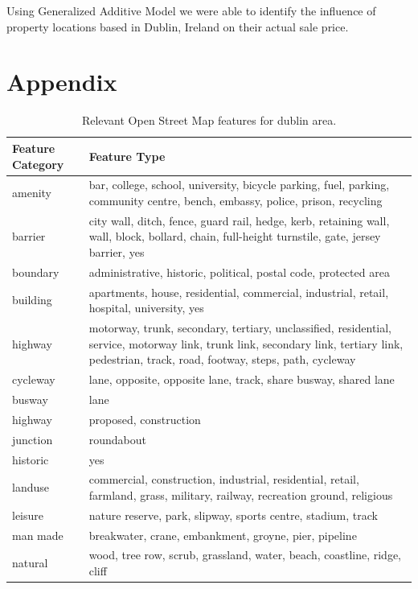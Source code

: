 \documentclass[]{elsarticle} %
\begin{document}
Using Generalized Additive Model we were able to identify the influence
of property locations based in Dublin, Ireland on their actual sale
price.

\section{Appendix}\label{appendix}

\begin{table}[t]

\caption{\label{tab:all_OSM_features}Relevant Open Street Map features for dublin area.}
\centering
\fontsize{8}{10}\selectfont
\begin{tabular}{l>{\raggedright\arraybackslash}p{3in}}
\toprule
Feature Category & Feature Type\\
\midrule
amenity & bar, college, school, university, bicycle parking, fuel, parking, community centre, bench, embassy, police, prison, recycling\\
barrier & city wall, ditch, fence, guard rail, hedge, kerb, retaining wall, wall, block, bollard, chain, full-height turnstile, gate, jersey barrier, yes\\
boundary & administrative, historic, political, postal code, protected area\\
building & apartments, house, residential, commercial, industrial, retail, hospital, university, yes\\
highway & motorway, trunk, secondary, tertiary, unclassified, residential, service, motorway link, trunk link, secondary link, tertiary link, pedestrian, track, road, footway, steps, path, cycleway\\
cycleway & lane, opposite, opposite lane, track, share busway, shared lane\\
busway & lane\\
highway & proposed, construction\\
junction & roundabout\\
historic & yes\\
landuse & commercial, construction, industrial, residential, retail, farmland, grass, military, railway, recreation ground, religious\\
leisure & nature reserve, park, slipway, sports centre, stadium, track\\
man made & breakwater, crane, embankment, groyne, pier, pipeline\\
natural & wood, tree row, scrub, grassland, water, beach, coastline, ridge, cliff\\

\end{tabular}
\end{table}
\end{document}

